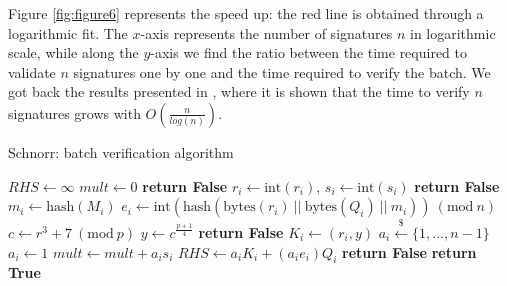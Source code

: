 \bigskip
\noindent
Figure \ref{fig:figure6} represents the speed up: the red line is obtained through a logarithmic fit. The $x$-axis represents the number of signatures $n$ in logarithmic scale, while along the $y$-axis we find the ratio between the time required to validate $n$ signatures one by one and the time required to verify the batch. We got back the results presented in \cite{RefWork:5}, where it is shown that the time to verify $n$ signatures grows with $O\left(\frac{n}{log(n)}\right)$.

\begin{algorithm}
	\caption{Schnorr: batch verification algorithm}
	\label{alg:schnorr_batch}
	\begin{algorithmic}[1]
		\State $RHS \gets \infty$
		\State $mult \gets 0$
		\State \textbf{return False}
		\EndIf
		\State $r_i \gets \text{int}(r_i)$, $s_i \gets \text{int}(s_i)$
		\State \textbf{return False}
		\EndIf
		\State $m_i \gets \text{hash}(M_i)$
		\State $e_i \gets \text{int}(\text{hash}(\text{bytes}(r_i) \ || \ \text{bytes}(Q_i) \ || \ m_i)) \ (\text{mod} \ n)$
		\State $c \gets r^3 + 7 \ (\text{mod} \ p)$
		\State $y \gets c^{\frac{p + 1}{4}}$
		\State \textbf{return False}
		\EndIf
		\State $K_i \gets (r_i, y)$
		\State  $a_i \xleftarrow{\text{\$}} \{1, ..., n - 1\}$ 
		\Else
		\State $a_i \gets 1$
		\EndIf
		\State $mult \gets mult + a_is_i$
		\State $RHS \gets a_iK_i + (a_ie_i)Q_i$
		\EndFor
		\State \textbf{return False}
		\EndIf
		\State \textbf{return True}
		\EndProcedure	
	\end{algorithmic}
\end{algorithm}
